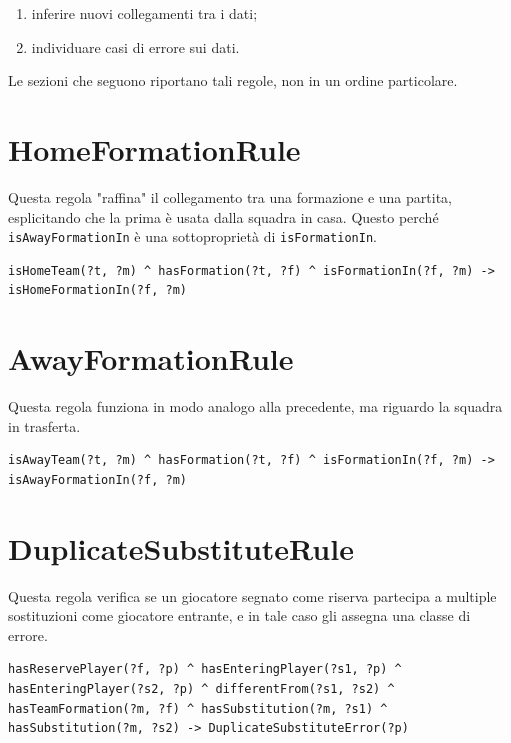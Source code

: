 \documentclass[11pt]{report} %
\begin{document}
\begin{enumerate}
    \item inferire nuovi collegamenti tra i dati;
    \item individuare casi di errore sui dati.
\end{enumerate}

Le sezioni che seguono riportano tali regole, non in un ordine particolare.

\section{HomeFormationRule}

Questa regola "raffina" il collegamento tra una formazione e una partita, esplicitando che la prima è usata dalla squadra in casa.
Questo perché \texttt{isAwayFormationIn} è una sottoproprietà di \texttt{isFormationIn}.

\begin{lstlisting}[language=SWRL]
isHomeTeam(?t, ?m) ^ hasFormation(?t, ?f) ^ isFormationIn(?f, ?m) -> isHomeFormationIn(?f, ?m)
\end{lstlisting}

\section{AwayFormationRule}

Questa regola funziona in modo analogo alla precedente, ma riguardo la squadra in trasferta.

\begin{lstlisting}[language=SWRL]
isAwayTeam(?t, ?m) ^ hasFormation(?t, ?f) ^ isFormationIn(?f, ?m) -> isAwayFormationIn(?f, ?m)
\end{lstlisting}

\newpage

\section{DuplicateSubstituteRule}

Questa regola verifica se un giocatore segnato come riserva partecipa a multiple sostituzioni come giocatore entrante, e in tale caso gli assegna una classe di errore.

\begin{lstlisting}[language=SWRL]
hasReservePlayer(?f, ?p) ^ hasEnteringPlayer(?s1, ?p) ^ hasEnteringPlayer(?s2, ?p) ^ differentFrom(?s1, ?s2) ^ hasTeamFormation(?m, ?f) ^ hasSubstitution(?m, ?s1) ^ hasSubstitution(?m, ?s2) -> DuplicateSubstituteError(?p)
\end{lstlisting}
\end{document}
